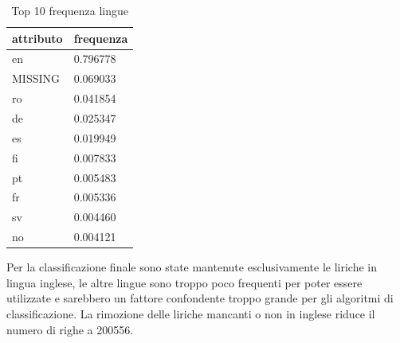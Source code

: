 \documentclass[technote]{IEEEtran}
\begin{document}
\begin{table}[H]
\centering
\caption{Top 10 frequenza lingue}
\begin{tabular}{|l|l|}
\hline
\textbf{attributo} & \textbf{frequenza} \\ \hline
en                 & 0.796778           \\ \hline
MISSING            & 0.069033           \\ \hline
ro                 & 0.041854           \\ \hline
de                 & 0.025347           \\ \hline
es                 & 0.019949           \\ \hline
fi                 & 0.007833           \\ \hline
pt                 & 0.005483           \\ \hline
fr                 & 0.005336           \\ \hline
sv                 & 0.004460           \\ \hline
no                 & 0.004121           \\ \hline
\end{tabular}
\label{t_lang}
\end{table}
Per la classificazione finale sono state mantenute esclusivamente le liriche in lingua inglese, le altre lingue sono troppo poco frequenti per poter essere utilizzate e sarebbero un fattore confondente troppo grande per gli algoritmi di classificazione.
La rimozione delle liriche mancanti o non in inglese riduce il numero di righe a 200556.
\end{document}
